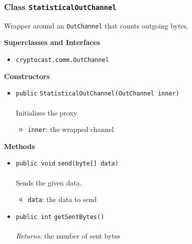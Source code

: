 \subsubsection{Class \lstinline|StatisticalOutChannel|}
Wrapper around an \lstinline|OutChannel| that counts outgoing bytes. \\
\noindent\begin{minipage}[t]{5cm}
\vspace{0.3em}
\hspace*{2em}
\vspace{0.3em}
\end{minipage}



\textbf{\sffamily Superclasses and Interfaces}
\begin{itemize}
\item \lstinline|cryptocast.comm.OutChannel|
\end{itemize}


\textbf{\sffamily Constructors}
\begin{itemize}
\item \lstinline|public| \lstinline|StatisticalOutChannel|\lstinline|(OutChannel inner)|\\ \\[-0.6em]
Initializes the proxy
\begin{itemize}
\item \lstinline|inner|: the wrapped channel
\end{itemize}



\end{itemize}


\textbf{\sffamily Methods}
\begin{itemize}
\item \lstinline|public void| \lstinline|send|\lstinline|(byte[] data)|\\ \\[-0.6em]
Sends the given data.
\begin{itemize}
\item \lstinline|data|: the data to send
\end{itemize}



\item \lstinline|public int| \lstinline|getSentBytes|\lstinline|()|\\ \\[-0.6em]
\emph{Returns:} the number of sent bytes



\end{itemize}

